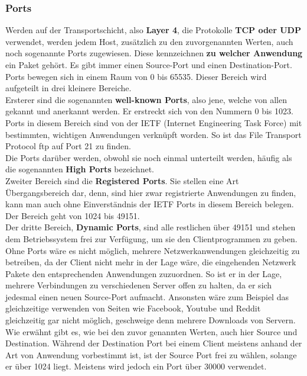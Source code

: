 \documentclass[12pt,a4paper]{report}
\begin{document}
\begin{onehalfspace}
\subsubsection{Ports}
Werden auf der Transportschicht, also \textbf{Layer 4}, die Protokolle \textbf{TCP oder UDP} verwendet, werden jedem Host, zusätzlich zu den zuvorgenannten Werten, auch noch sogenannte Ports zugewiesen. Diese kennzeichnen \textbf{zu welcher Anwendung} ein Paket gehört. Es gibt immer einen Source-Port und einen Destination-Port.\\
Ports bewegen sich in einem Raum von 0 bis 65535. Dieser Bereich wird aufgeteilt in drei kleinere Bereiche.\\
Ersterer sind die sogenannten \textbf{well-known Ports}, also jene, welche von allen gekannt und anerkannt werden. Er erstreckt sich von den Nummern 0 bis 1023. Ports in diesem Bereich sind von der IETF (Internet Engineering Task Force) mit bestimmten, wichtigen Anwendungen verknüpft worden. So ist das File Transport Protocol ftp auf Port 21 zu finden.\\
Die Ports darüber werden, obwohl sie noch einmal unterteilt werden, häufig als die sogenannten \textbf{High Ports} bezeichnet.\\
Zweiter Bereich sind die \textbf{Registered Ports}. Sie stellen eine Art Übergangsbereich dar, denn, sind hier zwar registrierte Anwendungen zu finden, kann man auch ohne Einverständnis der IETF Ports in diesem Bereich belegen. Der Bereich geht von 1024 bis 49151.\\
Der dritte Bereich, \textbf{Dynamic Ports}, sind alle restlichen über 49151 und stehen dem Betriebssystem frei zur Verfügung, um sie den Clientprogrammen zu geben.\\

Ohne Ports wäre es nicht möglich, mehrere Netzwerkanwendungen gleichzeitig zu betreiben, da der Client nicht mehr in der Lage wäre, die eingehenden Netzwerk Pakete den entsprechenden Anwendungen zuzuordnen. So ist er in der Lage, mehrere Verbindungen zu verschiedenen Server offen zu halten, da er sich jedesmal einen neuen Source-Port aufmacht. Ansonsten wäre zum Beispiel das gleichzeitige verwenden von Seiten wie Facebook, Youtube und Reddit gleichzeitig gar nicht möglich, geschweige denn mehrere Downloads von Servern.\\

Wie erwähnt gibt es, wie bei den zuvor genannten Werten, auch hier Source und Destination. Während der Destination Port bei einem Client meistens anhand der Art von Anwendung vorbestimmt ist, ist der Source Port frei zu wählen, solange er über 1024 liegt. Meistens wird jedoch ein Port über 30000 verwendet. 


\end{onehalfspace}
\end{document}
